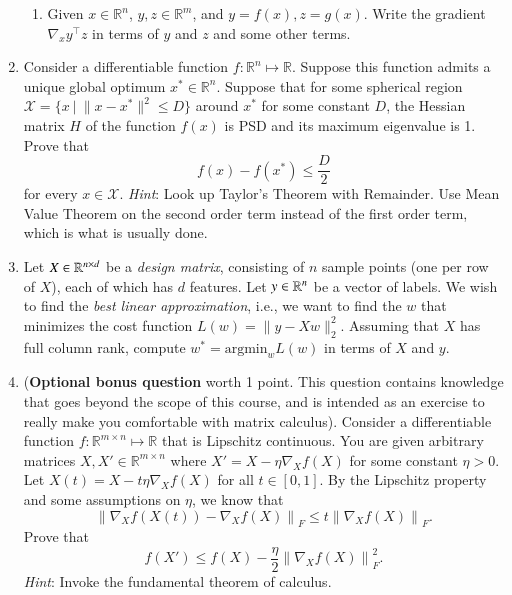 \documentclass[11pt]{article}
\begin{document}
\begin{enumerate}
\begin{enumerate}
        \item Given $x \in \mathbb{R}^n$, $y, z \in \mathbb{R}^m$, and $y = f(x), z = g(x)$. Write the gradient $\nabla_x y^\top z$ in terms of $y$ and $z$ and some other terms.
        
    \end{enumerate}
    
    

    
    \item Consider a differentiable function $f: \mathbb{R}^{n} \mapsto \mathbb{R}$. Suppose this function admits a unique global optimum $x^* \in \mathbb{R}^n$. Suppose that for some spherical region $\mathcal{X} = \{x \ | \ \|x-x^*\|^2 \leq D\}$ around $x^*$ for some constant $D$, the Hessian matrix $H$ of the function $f(x)$ is PSD and its maximum eigenvalue is 1. Prove that
    \[
        f(x) - f(x^*) \leq \frac{D}{2} 
    \]
    for every $x \in \mathcal{X}$.
    {\em Hint}: Look up Taylor's Theorem with Remainder. Use Mean Value Theorem on the second order term instead of the first order term, which is what is usually done.
    
    
    \item Let $X\in\mathbb{R}^{n\times d}$ be a {\em design matrix}, consisting of $n$ sample points (one per row of $X$), each of which has $d$ features. Let $y\in\mathbb{R}^n$ be a vector of labels. We wish to find the \emph{best linear approximation}, i.e., we want to find the $w$ that minimizes the cost function $L(w) = \|y-Xw\|_2^2$. Assuming that $X$ has full column rank, compute $w^* = \mathrm{argmin}_w L(w)$ in terms of $X$ and $y$.
    
    
    
    \item ({\bf Optional bonus question} worth 1 point. This question contains knowledge that goes beyond the scope of this course, and is intended as an exercise to really make you comfortable with matrix calculus). Consider a differentiable function $f: \mathbb{R}^{m \times n} \mapsto \mathbb{R}$ that is Lipschitz continuous. You are given arbitrary matrices $X, X' \in \mathbb{R}^{m \times n}$ where $X' = X - \eta \nabla_X f(X)$ for some constant $\eta >0$. Let $X(t) = X - t \eta \nabla_X f(X)$ for all $t \in [0,1]$. By the Lipschitz property and some assumptions on $\eta$, we know that
    \[
        \left\|\nabla_X f(X(t)) - \nabla_X f(X) \right\|_F \leq t \left\|\nabla_X f(X) \right\|_F.
    \]
    Prove that
    \[
        f(X') \leq f(X) - \frac{\eta}{2} \left\| \nabla_X f(X) \right\|^2_F.
    \]
    {\em Hint}: Invoke the fundamental theorem of calculus.
    
\end{enumerate}
\end{document}
